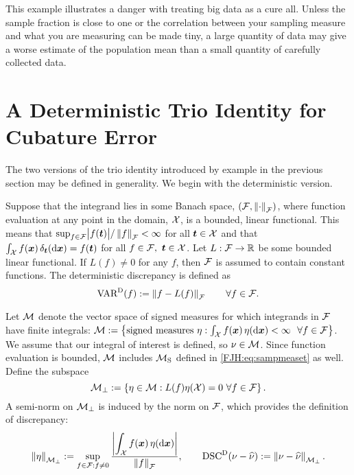 \documentclass[graybox,footinfo]{svmult}
\begin{document}
This example illustrates a danger with treating big data as a cure all. Unless 
the 
sample fraction is close to one or the correlation between 
your sampling measure and what you are measuring can be made tiny, a large quantity of 
data may give a worse estimate of the population mean than a small quantity of carefully 
collected data.

\begin{FJHLesson}
	\FJHLessonOne
\end{FJHLesson}

\section{A Deterministic Trio Identity for Cubature Error} \label{FJH:sec:dettrio}
The two versions of the trio identity introduced by example in the previous section may 
be defined in generality. We begin with the deterministic version.  

Suppose that the integrand lies in some Banach space, $({\mathcal{F}},\left \lVert \cdot \right \rVert_{{\mathcal{F}}})$, 
where 
function 
evaluation at any point  in the 
domain,  ${\mathcal{X}}$, is a 
bounded, linear functional.  This means that $\sup_{f \in {\mathcal{F}}} 
\bigl \lvert f({\boldsymbol{t}}) \bigr \rvert/\left \lVert f \right \rVert_{{\mathcal{F}}} < 
\infty$ for all ${\boldsymbol{t}} \in {\mathcal{X}}$ and that $\int_{{\mathcal{X}}} f({\boldsymbol{x}}) \, \delta_{{\boldsymbol{t}}}(\mathrm{d}{\boldsymbol{x}}) 
=f({\boldsymbol{t}})$ 
for all $f \in {\mathcal{F}}, \ {\boldsymbol{t}} \in {\mathcal{X}}$.  Let $L :{\mathcal{F}} \to {\mathbb{R}}$ be some bounded 
linear functional.  If $L(f) \ne 0$ for any $f$, then ${\mathcal{F}}$ is assumed to contain  
constant functions.  The deterministic discrepancy is defined as 
\begin{equation}  \label{FJH:eq:detvardef}
\Var^{\Dt}(f) := \norm{f- L(f)}_{\calF} \qquad \forall f \in \calF.
\end{equation} 

Let ${\mathcal{M}}$ denote the vector space of signed measures for which integrands in 
${\mathcal{F}}$ 
have finite integrals: $\calM : = \bigl \{\text{signed measures } \eta : \int_{\calX} f(\bsx) 
\, \eta(\D\bsx) < \infty \ 
\ 
\forall f \in \calF \bigr \}$.
We assume that our integral of interest is defined, so $\nu \in {\mathcal{M}}$.  Since function 
evaluation is bounded, ${\mathcal{M}}$ includes ${\mathcal{M}}_{\textup{S}}$ defined in 
\eqref{FJH:eq:sampmeaset} as well.  Define the subspace  
\begin{equation} \label{FJH:eq:Mperpdef}
\calM_\bot : = \left \{\eta \in \calM :  L(f) \eta(\calX) = 0  \ \forall f \in \calF
\right\}.
\end{equation} 
A semi-norm on ${\mathcal{M}}_\bot$ is induced by the norm on ${\mathcal{F}}$, which provides the 
definition of discrepancy:
\begin{equation} \label{FJH:eq:detdiscdef}
\norm{\eta}_{\calM_\bot}  : =\sup_{f \in \calF : f \ne 0} \frac{\displaystyle 
\biggabs{\int_{\calX} 
f(\bsx) \, \eta(\D \bsx)}}{\norm{f}_{\calF}}, \qquad \disc^\Dt(\nu - \hnu) : = \norm{\nu - 
\hnu}_{\calM_\bot}.
\end{equation}
\end{document}
